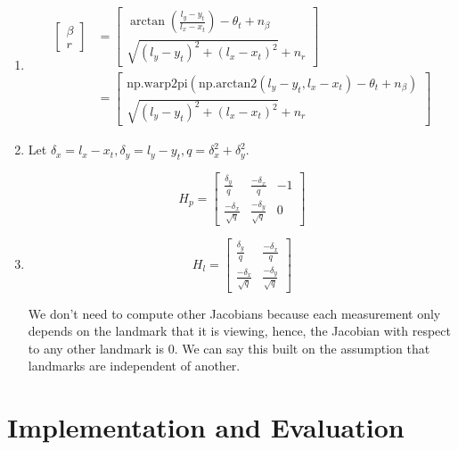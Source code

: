 \documentclass{article}
\begin{document}
\begin{enumerate}
    \item
    \begin{align*} 
    \begin{bmatrix} \beta \\ r \end{bmatrix} &= \begin{bmatrix} \arctan(\frac{l_y - y_t}{l_x - x_t}) - \theta_t + n_\beta \\ \sqrt{(l_y - y_t)^2 + (l_x - x_t)^2} + n_r \end{bmatrix} \\
    &= \begin{bmatrix} \text{np.warp2pi}(\text{np.arctan2}(l_y - y_t, l_x - x_t) - \theta_t + n_\beta) \\ \sqrt{(l_y - y_t)^2 + (l_x - x_t)^2} + n_r \end{bmatrix}
    \end{align*}

    \item Let $\delta_x = l_x - x_t, \delta_y = l_y - y_t, q = \delta_x^2 + \delta_y^2$.

    \[ H_p = \begin{bmatrix} \frac{\delta_y}{q} & \frac{-\delta_x}{q} & -1 \\ \frac{-\delta_x}{\sqrt{q}} & \frac{-\delta_y}{\sqrt{q}} & 0 \end{bmatrix} \]

    \item \[ H_l  =  \begin{bmatrix} \frac{\delta_y}{q} & \frac{-\delta_x}{q} \\ \frac{-\delta_x}{\sqrt{q}} & \frac{-\delta_y}{\sqrt{q}} \end{bmatrix}\] 

    We don't need to compute other Jacobians because each measurement only depends on the landmark that it is viewing, hence, the Jacobian with respect to any other landmark is 0. We can say this built on the assumption that landmarks are independent of another.

\end{enumerate}



\section{Implementation and Evaluation}
\end{document}
